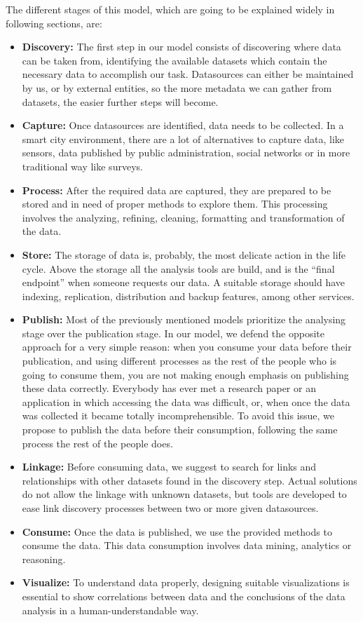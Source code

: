 The different stages of this model, which are going to be explained widely in following sections, are:
\begin{itemize}
	\item \textbf{Discovery:} The first step in our model consists of discovering where data can be taken from, identifying the available datasets which contain the necessary data to accomplish our task. Datasources can either be maintained by us, or by external entities, so the more metadata we can gather from datasets, the easier further steps will become.
    \item \textbf{Capture:} Once datasources are identified, data needs to be collected. In a smart city environment, there are a lot of alternatives to capture data, like sensors, data published by public administration, social networks or in more traditional way like surveys.
    \item \textbf{Process:} After the required data are captured, they are prepared to be stored and in need of proper methods to explore them. This processing involves the analyzing, refining, cleaning, formatting and transformation of the data.
    \item \textbf{Store:} The storage of data is, probably, the most delicate action in the life cycle. Above the storage  all the analysis tools are build, and is the ``final endpoint'' when someone requests our data. A suitable storage should have indexing, replication, distribution and backup features, among other services.
    \item \textbf{Publish:} Most of the previously mentioned models prioritize the analysing stage over the publication stage. In our model, we defend the opposite approach for a very simple reason: when you consume your data before their publication, and using different processes as the rest of the people who is going to consume them, you are not making enough emphasis on publishing these data correctly. Everybody has ever met a research paper or an application in which accessing the data was difficult, or, when once the data was collected it became totally incomprehensible. To avoid this issue, we propose to publish the data before their consumption, following the same process the rest of the people does.
    \item \textbf{Linkage:} Before consuming data, we suggest to search for links and relationships with other datasets found in the discovery step. Actual solutions do not allow the linkage with unknown datasets, but tools are developed to ease link discovery processes between two or more given datasources.
    \item \textbf{Consume:} Once the data is published, we use the provided methods to consume the data. This data consumption involves data mining, analytics or reasoning.
    \item \textbf{Visualize:} To understand data properly, designing suitable visualizations is essential to show correlations between data and the conclusions of the data analysis in a human-understandable way.
    
\end{itemize}

